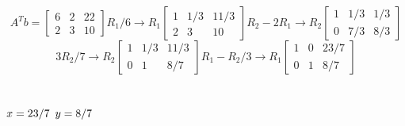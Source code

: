 \documentclass[letterpaper, 11pt]{article}
\begin{document}
\[
A^Tb = 
\begin{bmatrix}
    6 & 2 & 22\\
    2 & 3 & 10
\end{bmatrix}
R_1/6 \rightarrow R_1
\begin{bmatrix}
    1 & 1/3 & 11/3\\
    2 & 3 & 10
\end{bmatrix}
R_2 - 2R_1 \rightarrow R_2
\begin{bmatrix}
    1 & 1/3 & 1/3\\
    0 & 7/3 & 8/3
\end{bmatrix}
\]
\[
3R_2/7 \rightarrow R_2
\begin{bmatrix}
    1 & 1/3 & 11/3\\
    0 & 1 & 8/7
\end{bmatrix}
R_1 - R_2/3 \rightarrow R_1
\begin{bmatrix}
    1 & 0 & 23/7\\
    0 & 1 & 8/7
\end{bmatrix}
\]
\\
\\
\indent $x = 23/7 \\$
\indent $y = 8/7 \\$
\end{document}
